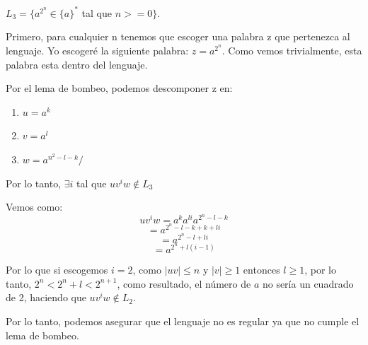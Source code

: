 \documentclass[12pt, spanish]{article}
\begin{document}
 \subsection{}
 $L_3 = \{ a^{2^n} \in \{a\}^{*} $ tal que  $ n >= 0 \}$.

Primero, para cualquier n tenemos que escoger una palabra z que pertenezca al lenguaje. Yo escogeré la siguiente palabra: $z = a^{2^n}$. Como vemos trivialmente, esta palabra esta dentro del lenguaje.

Por el lema de bombeo, podemos descomponer z en:

\begin{enumerate}
	\item $u = a^k$
	\item $v = a^l$
	\item $w =a^{n^2 - l - k}/$
\end{enumerate}

Por lo tanto, $\exists i$ tal que $uv^iw \not \in L_3$

Vemos como:
	$$uv^iw = a^ka^{li}a^{2^n - l - k}$$ 
	$$ =  a^{2^n - l - k + k + li}$$
	$$ =  a^{2^n - l  + li}$$
	$$ =  a^{2^n + l(i - 1)} $$
	

Por lo que si escogemos $i = 2$, como $|uv| \leq n$ y $|v| \geq 1$ entonces $l \geq 1$, por lo tanto, $2^n < 2^n+l < 2^{n+1}$, como resultado, el número de $a$ no sería un cuadrado de 2, haciendo que $uv^iw \not \in L_2$.

Por lo tanto, podemos asegurar que el lenguaje no es regular ya que no cumple el lema de bombeo.
\end{document}
